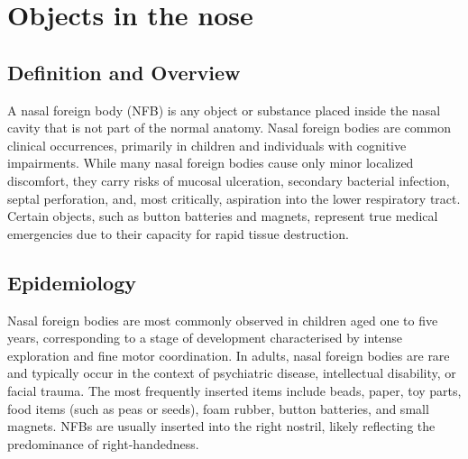 \chapter{Objects in the nose}

\section*{Definition and Overview}
A nasal foreign body (NFB) is any object or substance placed inside the nasal cavity that is not part of the normal anatomy. Nasal foreign bodies are common clinical occurrences, primarily in children and individuals with cognitive impairments. While many nasal foreign bodies cause only minor localized discomfort, they carry risks of mucosal ulceration, secondary bacterial infection, septal perforation, and, most critically, aspiration into the lower respiratory tract. Certain objects, such as button batteries and magnets, represent true medical emergencies due to their capacity for rapid tissue destruction.

\section*{Epidemiology}
Nasal foreign bodies are most commonly observed in children aged one to five years, corresponding to a stage of development characterised by intense exploration and fine motor coordination. In adults, nasal foreign bodies are rare and typically occur in the context of psychiatric disease, intellectual disability, or facial trauma. The most frequently inserted items include beads, paper, toy parts, food items (such as peas or seeds), foam rubber, button batteries, and small magnets. NFBs are usually inserted into the right nostril, likely reflecting the predominance of right-handedness.

